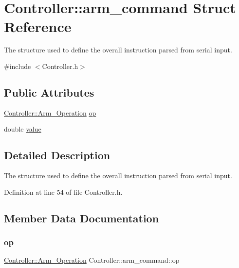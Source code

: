 \hypertarget{struct_controller_1_1arm__command}{}\section{Controller\+:\+:arm\+\_\+command Struct Reference}
\label{struct_controller_1_1arm__command}


The structure used to define the overall instruction parsed from serial input.  




{\ttfamily \#include $<$Controller.\+h$>$}

\subsection*{Public Attributes}
\begin{DoxyCompactItemize}
\item 
\hyperlink{class_controller_a91a5751dd6920daf3b70814171b51767}{Controller\+::\+Arm\+\_\+\+Operation} \hyperlink{struct_controller_1_1arm__command_ac31649d9bb8a03e80a86a59bdfa0be75}{op}
\item 
double \hyperlink{struct_controller_1_1arm__command_a2e40c7e8947f625f1d39ac9568a1976a}{value}
\end{DoxyCompactItemize}


\subsection{Detailed Description}
The structure used to define the overall instruction parsed from serial input. 

Definition at line 54 of file Controller.\+h.



\subsection{Member Data Documentation}
\mbox{\label{struct_controller_1_1arm__command_ac31649d9bb8a03e80a86a59bdfa0be75}} 
\subsubsection{\texorpdfstring{op}{op}}
{\footnotesize\ttfamily \hyperlink{class_controller_a91a5751dd6920daf3b70814171b51767}{Controller\+::\+Arm\+\_\+\+Operation} Controller\+::arm\+\_\+command\+::op}

